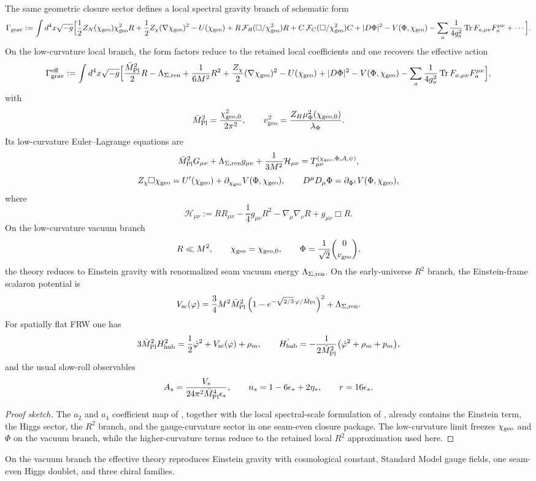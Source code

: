 \begin{theorem}
\label{thm:gravity-cosmology-closure}
The same geometric closure sector defines a local spectral gravity branch of schematic form
\[
\Gamma_{\mathrm{grav}}
:=
\int d^4x\sqrt{-g}\Big[
\frac12 Z_N(\chi_{\mathrm{geo}})\chi_{\mathrm{geo}}^2R
+\frac12 Z_\chi(\nabla\chi_{\mathrm{geo}})^2
-U(\chi_{\mathrm{geo}})
+R\,\mathcal F_R(\Box/\chi_{\mathrm{geo}}^2)R
+C\,\mathcal F_C(\Box/\chi_{\mathrm{geo}}^2)C
+|D\Phi|^2
-V(\Phi,\chi_{\mathrm{geo}})
-\sum_a \frac{1}{4g_a^2}\operatorname{Tr} F_{a,\mu\nu}F_a^{\mu\nu}
+\cdots
\Big].
\]
On the low-curvature local branch, the form factors reduce to the retained local coefficients and one recovers the effective action
\[
\Gamma_{\mathrm{grav}}^{\mathrm{eff}}
:=
\int d^4x\sqrt{-g}\Big[
\frac{\bar M_{\mathrm{Pl}}^2}{2}R
-\Lambda_{\Sigma,\mathrm{ren}}
+\frac{1}{6M^2}R^2
+\frac{Z_\chi}{2}(\nabla\chi_{\mathrm{geo}})^2
-U(\chi_{\mathrm{geo}})
+|D\Phi|^2
-V(\Phi,\chi_{\mathrm{geo}})
-\sum_a \frac{1}{4g_a^2}\operatorname{Tr} F_{a,\mu\nu}F_a^{\mu\nu}
\Big],
\]
with
\[
\bar M_{\mathrm{Pl}}^2=\frac{\chi_{\mathrm{geo},0}^2}{2\pi^2},
\qquad
v_{\mathrm{geo}}^2=\frac{Z_H\mu_\Phi^2(\chi_{\mathrm{geo},0})}{\lambda_\Phi}.
\]
Its low-curvature Euler--Lagrange equations are
\[
\bar M_{\mathrm{Pl}}^2 G_{\mu\nu}
+\Lambda_{\Sigma,\mathrm{ren}} g_{\mu\nu}
+\frac{1}{3M^2}\mathcal H_{\mu\nu}
=
T_{\mu\nu}^{(\chi_{\mathrm{geo}},\Phi,A,\psi)},
\]
\[
Z_\chi\Box\chi_{\mathrm{geo}}=U'(\chi_{\mathrm{geo}})+\partial_{\chi_{\mathrm{geo}}}V(\Phi,\chi_{\mathrm{geo}}),
\qquad
D^\mu D_\mu\Phi=\partial_{\Phi^\dagger}V(\Phi,\chi_{\mathrm{geo}}),
\]
where
\[
\mathcal H_{\mu\nu}
:=
RR_{\mu\nu}
-\frac14 g_{\mu\nu}R^2
-\nabla_\mu\nabla_\nu R
+g_{\mu\nu}\Box R.
\]
On the low-curvature vacuum branch
\[
R\ll M^2,
\qquad
\chi_{\mathrm{geo}}=\chi_{\mathrm{geo},0},
\qquad
\Phi=\frac{1}{\sqrt2}\binom{0}{v_{\mathrm{geo}}},
\]
the theory reduces to Einstein gravity with renormalized seam vacuum energy $\Lambda_{\Sigma,\mathrm{ren}}$.
On the early-universe $R^2$ branch, the Einstein-frame scalaron potential is
\[
V_{\mathrm{sc}}(\varphi)
=
\frac34 M^2\bar M_{\mathrm{Pl}}^2
\left(1-e^{-\sqrt{2/3}\,\varphi/\bar M_{\mathrm{Pl}}}\right)^2
+\Lambda_{\Sigma,\mathrm{ren}}.
\]
For spatially flat FRW one has
\[
3\bar M_{\mathrm{Pl}}^2H_{\mathrm{hub}}^2
=
\frac12\dot\varphi^2+V_{\mathrm{sc}}(\varphi)+\rho_m,
\qquad
\dot{H_{\mathrm{hub}}}
=
-\frac{1}{2\bar M_{\mathrm{Pl}}^2}\bigl(\dot\varphi^2+\rho_m+p_m\bigr),
\]
and the usual slow-roll observables
\[
A_s=\frac{V_*}{24\pi^2\bar M_{\mathrm{Pl}}^4\epsilon_*},
\qquad
n_s=1-6\epsilon_*+2\eta_*,
\qquad
r=16\epsilon_*.
\]
\end{theorem}

\begin{proof}[Proof sketch]
The $a_2$ and $a_4$ coefficient map of , together with the local spectral-scale formulation of , already contains the Einstein term, the Higgs sector, the $R^2$ branch, and the gauge-curvature sector in one seam-even closure package. The low-curvature limit freezes $\chi_{\mathrm{geo}}$ and $\Phi$ on the vacuum branch, while the higher-curvature terms reduce to the retained local $R^2$ approximation used here.
\end{proof}

\begin{corollary}
On the vacuum branch the effective theory reproduces Einstein gravity with cosmological constant, Standard Model gauge fields, one seam-even Higgs doublet, and three chiral families.
\end{corollary}
